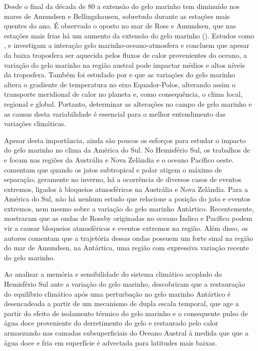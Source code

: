 \documentclass{article}
\begin{document}
Desde o final da década de 80 a extensão do gelo marinho tem diminuído nos mares de Amundsen 
e Bellingshausen, sobretudo durante as estações mais quentes do ano. É observado o oposto no mar de Ross e Amundsen, 
que nas estações mais frias há um aumento da extensão do gelo marinho (\cite{Lee2017}). Estudos como 
\textcite{Parise2015}, \textcite{Cunningham2011} e \textcite{Raphael2011} investigam a interação 
gelo marinho-oceano-atmosfera e concluem que apesar da baixa troposfera ser aquecida pelos fluxos de calor
provenientes do oceano, a variação do gelo marinho na região austral pode impactar médios e altos níveis da troposfera.
Também foi estudado por \textcite{Carpenedo2013} e \textcite{Parise2015} que as variações do gelo marinho altera o 
gradiente de temperatura no eixo Equador-Polos, alterando assim o transporte meridional de calor no planeta e, como
consequência, o clima local, regional e global. Portanto, determinar as alterações no campo de gelo marinho e as causas
desta variabilidade é essencial para o melhor entendimento das variações climáticas.

Apesar desta importância, ainda são poucos os esforços para estudar o impacto do gelo marinho no clima da América do Sul.
No Hemisfério Sul, os trabalhos de \textcite{Nakamura2004} e \textcite{Ummenhofer2007} focam nas regiões da Austrália
e Nova Zelândia e o oceano Pacífico oeste. \textcite{Pook2013} comentam que quando os jatos subtropical e polar 
atigem o máximo de separação, geramente no inverno, há a ocorrência de diversos casos de eventos extremos, ligados à
bloqueios atmosféricos na Austrália e Nova Zelândia. Para a América do Sul, não há nenhum estudo que relacione a posição
do jato e eventos extremos, nem mesmo sobre a variação do gelo marinho Antártico. Recentemente, \textcite{Rodrigues2017}
mostraram que as ondas de Rossby originadas no oceano Índico e Pacífico podem vir a causar bloqueios atmosféricos 
e eventos extremos na região. Além disso, os autores comentam que a trajetória dessas ondas possuem um forte sinal na
região do mar de Amundsen, na Antártica, uma região com expressiva variação recente do gelo marinho.

Ao analisar a memória e sensibilidade do sistema climático acoplado do Hemisfério Sul ante a variação do gelo marinho, 
\textcite{Parise2015} descobriram que a restauração do equilíbrio climático após uma perturbação no gelo marinho Antártico
é desencadeada a partir de um mecanismo de dupla escala temporal, que age a partir do efeito de isolamento térmico do gelo marinho
e o consequente pulso de água doce proveniente do derretimento do gelo e restaurado pelo calor armaezando nas camadas 
subsuperficiais do Oceano Austral à medida que que a água doce e fria em superfície é advectada para latitudes mais baixas. 
\end{document}
